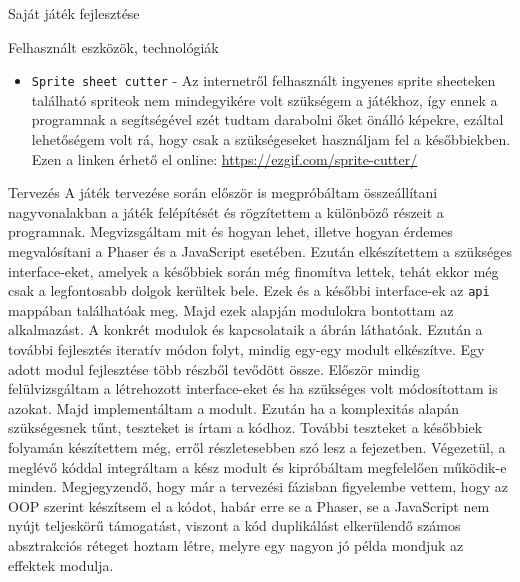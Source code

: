 \begin{MyChapter}{Saját játék fejlesztése}
\begin{MySection}{Felhasznált eszközök, technológiák}
\begin{itemize}
			\item \texttt{Sprite sheet cutter} - Az internetről felhasznált ingyenes sprite sheeteken található spriteok nem mindegyikére volt szükségem a játékhoz, így ennek a programnak a segítségével szét tudtam darabolni őket önálló képekre, ezáltal lehetőségem volt rá, hogy csak a szükségeseket használjam fel a későbbiekben. Ezen a linken érhető el online: \url{https://ezgif.com/sprite-cutter/}
			
		\end{itemize}
		
	\end{MySection}
	
	\begin{MySection}{Tervezés}
		A játék tervezése során először is megpróbáltam összeállítani nagyvonalakban a játék felépítését és rögzítettem a különböző részeit a programnak. Megvizsgáltam mit és hogyan lehet, illetve hogyan érdemes megvalósítani a Phaser és a JavaScript esetében.
		Ezután elkészítettem a szükséges interface-eket, amelyek a későbbiek során még finomítva lettek, tehát ekkor még csak a legfontosabb dolgok kerültek bele. Ezek és a későbbi interface-ek az \texttt{api} mappában találhatóak meg. Majd ezek alapján modulokra bontottam az alkalmazást. A konkrét modulok és kapcsolataik a  ábrán láthatóak. Ezután a további fejlesztés iteratív módon folyt, mindig egy-egy modult elkészítve. Egy adott modul fejlesztése több részből tevődött össze. Először mindig felülvizsgáltam a létrehozott interface-eket és ha szükséges volt módosítottam is azokat. Majd implementáltam a modult. Ezután ha a komplexitás alapán szükségesnek tűnt, teszteket is írtam a kódhoz. További teszteket a későbbiek folyamán készítettem még, erről részletesebben szó lesz a  fejezetben. Végezetül, a meglévő kóddal integráltam a kész modult és kipróbáltam megfelelően működik-e minden. Megjegyzendő, hogy már a tervezési fázisban figyelembe vettem, hogy az OOP szerint készítsem el a kódot, habár erre se a Phaser, se a JavaScript nem nyújt teljeskörű támogatást, viszont a kód duplikálást elkerülendő számos absztrakciós réteget hoztam létre, melyre egy nagyon jó példa mondjuk az effektek modulja.
		

\end{MySection}
\end{MyChapter}
